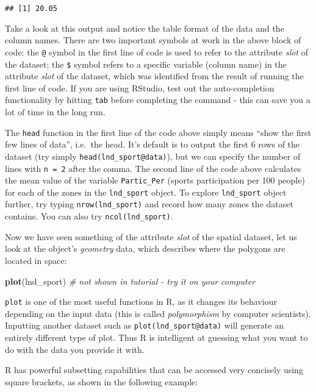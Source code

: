 \documentclass[]{article}
\newenvironment{Shaded}{}{}
\newcommand{\KeywordTok}[1]{\textcolor[rgb]{0.00,0.44,0.13}{\textbf{{#1}}}}
\newcommand{\CommentTok}[1]{\textcolor[rgb]{0.38,0.63,0.69}{\textit{{#1}}}}
\newcommand{\NormalTok}[1]{{#1}}
\begin{document}
\begin{verbatim}
## [1] 20.05
\end{verbatim}

Take a look at this output and notice the table format of the data and
the column names. There are two important symbols at work in the above
block of code: the \texttt{@} symbol in the first line of code is used
to refer to the attribute \emph{slot} of the dataset; the \texttt{\$}
symbol refers to a specific variable (column name) in the attribute
\emph{slot} of the dataset, which was identified from the result of
running the first line of code. If you are using RStudio, test out the
auto-completion functionality by hitting \texttt{tab} before completing
the command - this can save you a lot of time in the long run.

The \texttt{head} function in the first line of the code above simply
means ``show the first few lines of data'', i.e.~the head. It's default
is to output the first 6 rows of the dataset (try simply
\texttt{head(lnd\_sport@data)}), but we can specify the number of lines
with \texttt{n = 2} after the comma. The second line of the code above
calculates the mean value of the variable \texttt{Partic\_Per} (sports
participation per 100 people) for each of the zones in the
\texttt{lnd\_sport} object. To explore \texttt{lnd\_sport} object
further, try typing \texttt{nrow(lnd\_sport)} and record how many zones
the dataset contains. You can also try \texttt{ncol(lnd\_sport)}.

Now we have seen something of the attribute \emph{slot} of the spatial
dataset, let us look at the object's \emph{geometry} data, which
describes where the polygons are located in space:

\begin{Shaded}
\begin{Highlighting}[]
\KeywordTok{plot}\NormalTok{(lnd_sport) }\CommentTok{# not shown in tutorial - try it on your computer}
\end{Highlighting}
\end{Shaded}

\texttt{plot} is one of the most useful functions in R, as it changes
its behaviour depending on the input data (this is called
\emph{polymorphism} by computer scientists). Inputting another dataset
such as \texttt{plot(lnd\_sport@data)} will generate an entirely
different type of plot. Thus R is intelligent at guessing what you want
to do with the data you provide it with.

R has powerful subsetting capabilities that can be accessed very
concisely using square brackets, as shown in the following example:
\end{document}
